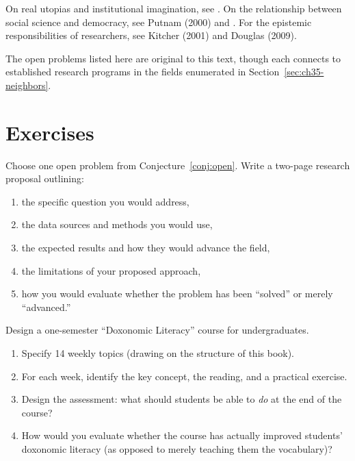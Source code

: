 On real utopias and institutional imagination, see \textcite{wright2010}.
On the relationship between social science and democracy, see Putnam (2000) and \textcite{dewey1927}.
For the epistemic responsibilities of researchers, see Kitcher (2001) and Douglas (2009).

The open problems listed here are original to this text, though each connects to established research programs in the fields enumerated in Section~\ref{sec:ch35-neighbors}.

\section{Exercises}

\begin{exercise}
Choose one open problem from Conjecture~\ref{conj:open}.
Write a two-page research proposal outlining:
\begin{enumerate}[nosep]
  \item the specific question you would address,
  \item the data sources and methods you would use,
  \item the expected results and how they would advance the field,
  \item the limitations of your proposed approach,
  \item how you would evaluate whether the problem has been ``solved'' or merely ``advanced.''
\end{enumerate}
\end{exercise}

\begin{exercise}
Design a one-semester ``Doxonomic Literacy'' course for undergraduates.
\begin{enumerate}[nosep]
  \item Specify 14 weekly topics (drawing on the structure of this book).
  \item For each week, identify the key concept, the reading, and a practical exercise.
  \item Design the assessment: what should students be able to \emph{do} at the end of the course?
  \item How would you evaluate whether the course has actually improved students' doxonomic literacy (as opposed to merely teaching them the vocabulary)?
\end{enumerate}
\end{exercise}

